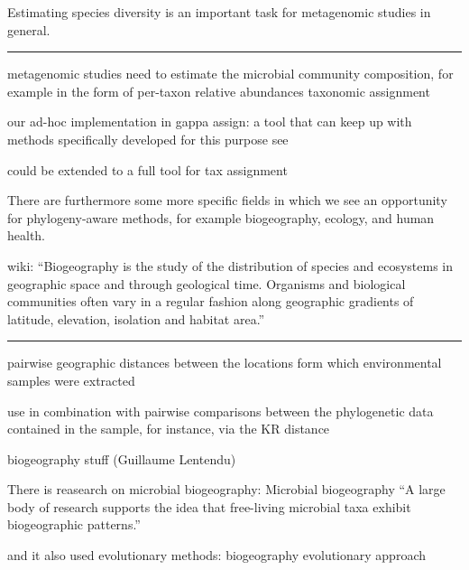 Estimating species diversity is an important task for metagenomic studies in general.



\noindent\rule{\textwidth}{0.4pt}

metagenomic studies need to estimate the microbial community composition, for example in the form of per-taxon relative abundances \cite{Lindgreen2016}
taxonomic assignment

our ad-hoc implementation in gappa assign:
a tool that can keep up with methods specifically developed for this purpose
\cite{Lindgreen2016,Sczyrba2017,Almeida2018}
see 

could be extended to a full tool for tax assignment



There are furthermore some more specific fields in which we see an opportunity for phylogeny-aware methods,
for example biogeography, ecology, and human health.




wiki:
``Biogeography is the study of the distribution of species and ecosystems in geographic space and through geological time.
Organisms and biological communities often vary in a regular fashion along geographic gradients of latitude, elevation, isolation and habitat area.''





\noindent\rule{\textwidth}{0.4pt}

pairwise geographic distances between the locations form which environmental samples were extracted

use in combination with pairwise comparisons between the phylogenetic data contained in the sample, for instance, via the KR distance


biogeography stuff (Guillaume Lentendu)

There is reasearch on microbial biogeography:
Microbial biogeography \cite{HughesMartiny2006}
``A large body of research supports the idea that free-living microbial taxa exhibit biogeographic patterns.''

and it also used evolutionary methods:
biogeography evolutionary approach
\cite{Cox2016}

